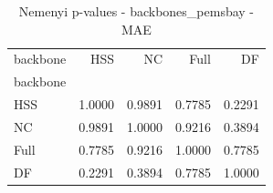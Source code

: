 \begin{table}
\caption{Nemenyi p-values - backbones_pemsbay - MAE}
\label{tab:nemenyi_backbones_pemsbay_mae}
\begin{tabular}{lrrrr}
\toprule
backbone & HSS & NC & Full & DF \\
backbone &  &  &  &  \\
\midrule
HSS & 1.0000 & 0.9891 & 0.7785 & 0.2291 \\
NC & 0.9891 & 1.0000 & 0.9216 & 0.3894 \\
Full & 0.7785 & 0.9216 & 1.0000 & 0.7785 \\
DF & 0.2291 & 0.3894 & 0.7785 & 1.0000 \\
\bottomrule
\end{tabular}
\end{table}
